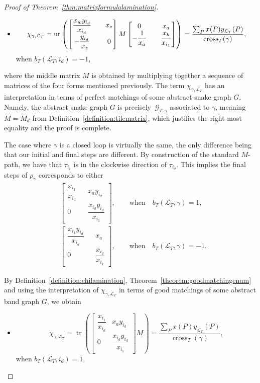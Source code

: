 \documentclass[pdftex]{sigma}
\numberwithin{equation}{section}
\theoremstyle{definition}
\begin{document}
\begin{proof}[Proof of Theorem~\ref{thm:matrixformulalamination}]
\begin{itemize}
\item \[
\chi_{\gamma, \mathcal{L}_{T}}=\operatorname{ur}\left(\begin{bmatrix}
\dfrac{x_w y_{i_d}}{x_{i_d}} && x_{z}\vspace{1mm}\\
-\dfrac{y_{i_d}}{x_{z}} && 0
\end{bmatrix}
M
\begin{bmatrix}
0 && x_a\\
-\dfrac{1}{x_a} && \dfrac{x_b}{x_{i_1}}
\end{bmatrix}\right)=\frac{\sum_P x(P)y_{\mathcal{L}_T}(P)}{\operatorname{cross}_T(\gamma)},\]
 when $ b_{T}(\mathcal{L}_{T}, i_{d})=-1$,
\end{itemize}
where the middle matrix $M$ is obtained by multiplying together a sequence of matrices of the four forms mentioned previously. The term $\chi_{\gamma, \mathcal{L}_T}$ has an interpretation in terms of perfect matchings of some abstract snake graph $G$. Namely, the abstract snake graph $G$ is precisely~$\mathcal{G}_{T, \gamma}$ associated to $\gamma$, meaning $M=M_d$ from Definition~\ref{definition:tilematrix}, which justifies the right-most equality and the proof is complete.

The case where $\gamma$ is a closed loop is virtually the same, the only difference being that our initial and final steps are different. By construction of the standard $M$-path, we have that $\tau_{i_1}$ is in the clockwise direction of $\tau_{i_d}$. This implies the final steps of $\rho_{\gamma}$ corresponds to either
\begin{align*}
 &\begin{bmatrix}
 \dfrac{x_{i_1}}{x_{i_d}} && x_a y_{i_d}\\
 0 && \dfrac{x_{i_d}y_{i_d}}{x_{i_1}}
 \end{bmatrix} ,\qquad\text{when}\quad b_T(\mathcal{L}_T, \gamma)=1,\\
 &\begin{bmatrix}
 \dfrac{x_{i_1}y_{i_d}}{x_{i_d}} && x_a\\
 0 && \dfrac{x_{i_d}}{x_{i_1}}
 \end{bmatrix} ,\qquad\text{when}\quad b_T(\mathcal{L}_T, \gamma)=-1.
\end{align*}

By Definition~\ref{definition:chilamination}, Theorem~\ref{theorem:goodmatchingenum} and using the interpretation of $\chi_{\gamma, \mathcal{L}_T}$ in terms of good matchings of some abstract band graph $G$, we obtain
\begin{itemize}\itemsep=0pt
 \item \[
 \chi_{\gamma, \mathcal{L}_{T}}=\operatorname{tr}\left(\begin{bmatrix}
\dfrac{x_{i_1}}{x_{i_d}} & x_{a}y_{i_d}\\
0 & \dfrac{x_{i_d}y_{i_d}}{x_{i_1}}
\end{bmatrix}
M\right)=\frac{\sum_P x(P)y_{\mathcal{L}_T}(P)}{\operatorname{cross}_T(\gamma)},
\]
 when $ b_{T}(\mathcal{L}_{T}, i_{d})=1$,


\end{itemize}
\end{proof}
\end{document}
